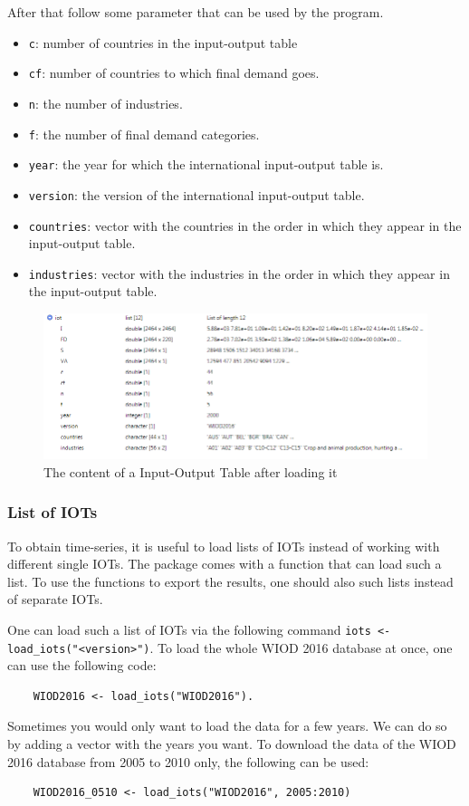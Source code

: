 \documentclass[10pt,a4paper]{paper}
\begin{document}
	After that follow some parameter that can be used by the program.
	\begin{itemize}
		\item \texttt{c}: number of countries in the input-output table
		\item \texttt{cf}: number of countries to which final demand goes.
		\item \texttt{n}: the number of industries. 
		\item \texttt{f}: the number of final demand categories. 
		\item \texttt{year}: the year for which the international input-output table is.
		\item \texttt{version}: the version of the international input-output table.
		\item \texttt{countries}: vector with the countries in the order in which they appear in the input-output table.
		\item \texttt{industries}: vector with the industries in the order in which they appear in the input-output table.
	\end{itemize}
	
	\begin{figure}[t]
	\centering
	\includegraphics[width=\linewidth]{content_iot}
	\caption{The content of a Input-Output Table after loading it}
	\label{fig:contentiot}
	\end{figure}

	
	\subsubsection{List of IOTs}
	To obtain time-series, it is useful to load lists of IOTs instead of working with different single IOTs. The package comes with a function that can load such a list. To use the functions to export the results, one should also such lists instead of separate IOTs.
	
	One can load such a list of IOTs via the following command \texttt{iots <- load\_iots("<version>")}. To load the whole WIOD 2016 database at once, one can use the following code:
	\begin{Verbatim}
	WIOD2016 <- load_iots("WIOD2016").
	\end{Verbatim}
	Sometimes you would only want to load the data for a few years. We can do so by adding a vector with the years you want. To download the data of the WIOD 2016 database from 2005 to 2010 only, the following can be used:
	\begin{Verbatim}
	WIOD2016_0510 <- load_iots("WIOD2016", 2005:2010)
	\end{Verbatim}
	
\end{document}
